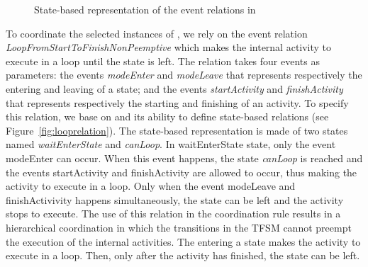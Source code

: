 \begin{figure}
	\centering
	\caption[]{State-based representation of the event relations in \moccml}
	\label{fig:subfigurestatebased}
\end{figure}

To coordinate the selected instances of \dse, we rely on the event relation \emph{LoopFromStartToFinishNonPeemptive} which makes the internal activity to execute in a loop until the state is left. The relation takes four events as parameters: the events \emph{modeEnter} and \emph{modeLeave} that represents respectively the entering and leaving of a state; and the events \emph{startActivity} and \emph{finishActivity} that represents respectively the starting and finishing of an activity. To specify this relation, we base on \moccml and its ability to define state-based relations (see Figure~\ref{fig:looprelation}). The state-based representation is made of two states named \emph{waitEnterState} and \emph{canLoop}. In waitEnterState state, only the event modeEnter can occur. When this event happens, the state \emph{canLoop} is reached and the events startActivity and finishActivity are allowed to occur, thus making the activity to execute in a loop. Only when the event modeLeave and finishActivivity happens simultaneously, the state can be left and the activity stops to execute. The use of this relation in the coordination rule results in a hierarchical coordination in which the transitions in the TFSM cannot preempt the execution of the internal activities. The entering a state makes the activity to execute in a loop. Then, only after the activity has finished, the state can be left.

